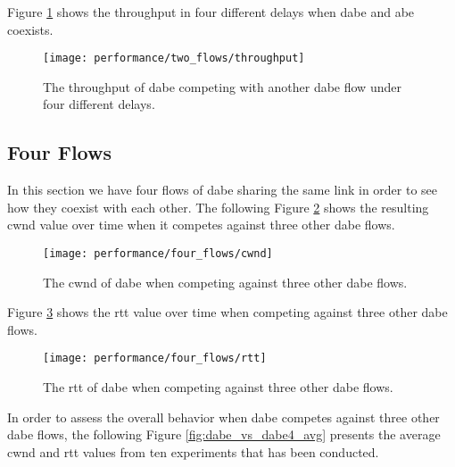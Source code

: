 Figure \ref{fig:dabe_vs_dabe_throughput} shows the throughput in four different delays when \gls{dabe} and \gls{abe} coexists.

\begin{figure}[H]
    \centering
    \texttt{[image: performance/two\_flows/throughput]}
    \captionsetup{width=1.0\linewidth}
    \caption{The throughput of \gls{dabe} competing with another \gls{dabe} flow under four different delays.}
    \label{fig:dabe_vs_dabe_throughput}
\end{figure}









\subsection{Four Flows}

In this section we have four flows of \gls{dabe} sharing the same link in order to see how they coexist with each other. The following Figure \ref{fig:dabe_vs_dabe4_cwnd} shows the resulting \gls{cwnd} value over time when it competes against three other \gls{dabe} flows.

\begin{figure}[H]
    \centering
    \texttt{[image: performance/four\_flows/cwnd]}
    \captionsetup{width=1.0\linewidth}
    \caption{The \gls{cwnd} of \gls{dabe} when competing against three other \gls{dabe} flows.}
    \label{fig:dabe_vs_dabe4_cwnd}
\end{figure}

Figure \ref{fig:dabe_vs_dabe4_rtt} shows the \gls{rtt} value over time when competing against three other \gls{dabe} flows.

\begin{figure}[H]
    \centering
    \texttt{[image: performance/four\_flows/rtt]}
    \captionsetup{width=1.0\linewidth}
    \caption{The \gls{rtt} of \gls{dabe} when competing against three other \gls{dabe} flows.}
    \label{fig:dabe_vs_dabe4_rtt}
\end{figure}

In order to assess the overall behavior when \gls{dabe} competes against three other \gls{dabe} flows, the following Figure \ref{fig:dabe_vs_dabe4_avg} presents the average \gls{cwnd} and \gls{rtt} values from ten experiments that has been conducted.


